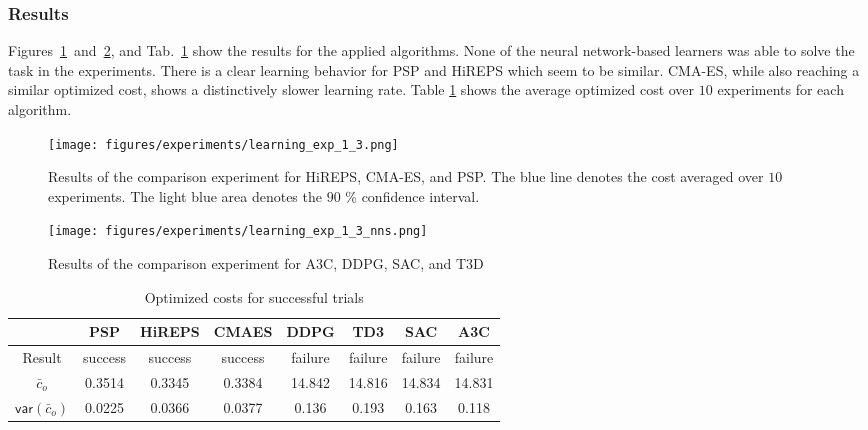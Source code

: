 \subsubsection{Results}

Figures~\ref{fig:learning:exp_1_3:results_1}~and~\ref{fig:learning:exp_1_3:results_2}, and Tab.~\ref{tab:learning:exp_1_3:results} show the results for the applied algorithms.
None of the neural network-based learners was able to solve the task in the experiments.
There is a clear learning behavior for PSP and HiREPS which seem to be similar.
CMA-ES, while also reaching a similar optimized cost, shows a distinctively slower learning rate.
Table \ref{tab:learning:exp_1_3:results} shows the average optimized cost over $10$ experiments for each algorithm.

\begin{figure}[ht!]
    \centering
    \texttt{[image: figures/experiments/learning\_exp\_1\_3.png]}
    \caption{Results of the comparison experiment for HiREPS, CMA-ES, and PSP. The blue line denotes the cost averaged over $10$ experiments. The light blue area denotes the $90$ \% confidence interval.}
    \label{fig:learning:exp_1_3:results_1}
\end{figure}

\begin{figure}[ht!]
    \centering
    \texttt{[image: figures/experiments/learning\_exp\_1\_3\_nns.png]}
    \caption{Results of the comparison experiment for A3C, DDPG, SAC, and T3D}
    \label{fig:learning:exp_1_3:results_2}
\end{figure}

\begin{table}[ht!]
\caption{Optimized costs for successful trials}
\label{tab:learning:exp_1_3:results}
\begin{center}
\begin{tabular}{ | c | c | c | c | c | c | c | c |}
			\hline
			& PSP & HiREPS & CMAES & DDPG& TD3& SAC & A3C  \\ \hline
			 Result  & success & success & success & failure & failure & failure & failure \\ \hline
			$\bar c_o$ & 0.3514 & 0.3345 & 0.3384  & 14.842 & 14.816 & 14.834 & 14.831 \\ \hline
			$\mathsf{var}(\bar c_o)$ & 0.0225 & 0.0366 & 0.0377 & 0.136 & 0.193 & 0.163 & 0.118 \\ \hline
\end{tabular}
\end{center}
\end{table}

